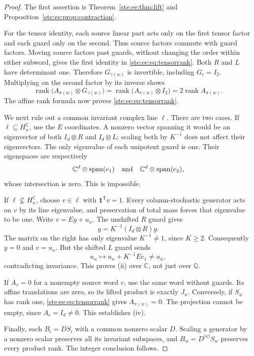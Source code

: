 \documentclass[11pt,letterpaper]{article}
\theoremstyle{definition}
\theoremstyle{remark}
\newcommand{\Q}{\mathbb Q}
\newcommand{\C}{\mathbb C}
\newcommand{\one}{\mathbf 1}
\newcommand{\rk}{\operatorname{rank}}
\newcommand{\transpose}{^{\mathsf T}}
\begin{document}
\begin{proof}
The first assertion is Theorem~\ref{ste:ee:thm:lift} and
Proposition~\ref{ste:ee:prop:contraction}.

For the tensor identity, each source linear part acts only on the first tensor
factor and each guard only on the second. Thus source factors commute with guard
factors. Moving source factors past guards, without changing the order within
either subword, gives the first identity in \eqref{ste:ee:eq:tensorrank}. Both $R$ and
$L$ have determinant one. Therefore $G_{\gamma(w)}$ is invertible, including
$G_\epsilon=I_2$. Multiplying on the second factor by its inverse shows
\[
 \rk\bigl(A_{\pi(w)}\otimes G_{\gamma(w)}\bigr)
 =\rk\bigl(A_{\pi(w)}\otimes I_2\bigr)=2\rk A_{\pi(w)}.
\]
The affine rank formula now proves \eqref{ste:ee:eq:tensorrank}.

We next rule out a common invariant complex line $\ell$. There are two cases.
If $\ell\subseteq H_n^{\C}$, use the $E$ coordinates. A nonzero vector spanning
it would be an eigenvector of both $I_d\otimes R$ and $I_d\otimes L$; scaling
both by $K^{-1}$ does not affect their eigenvectors. The only eigenvalue of each
unipotent guard is one. Their eigenspaces are respectively
\[
 \C^d\otimes\operatorname{span}(e_1)
 \quad\hbox{and}\quad
 \C^d\otimes\operatorname{span}(e_2),
\]
whose intersection is zero. This is impossible.

If $\ell\not\subseteq H_n^{\C}$, choose $v\in\ell$ with
$\one\transpose v=1$. Every column-stochastic generator acts on $v$ by its
line eigenvalue, and preservation of total mass forces that eigenvalue to be
one. Write $v=Ey+u_n$. The unshifted $R$ guard gives
\[
 y=K^{-1}(I_d\otimes R)y.
\]
The matrix on the right has only eigenvalue $K^{-1}\ne1$, since $K\geq2$.
Consequently $y=0$ and $v=u_n$. But the shifted $L$ guard sends
\[
 u_n\longmapsto u_n+K^{-1}Ee_1\ne u_n,
\]
contradicting invariance. This proves (ii) over $\C$, not just over $\Q$.

If $A_v=0$ for a nonempty source word $v$, use the same word without guards.
Its affine translations are zero, so its lifted product is exactly $J_n$.
Conversely, if $S_w$ has rank one, \eqref{ste:ee:eq:tensorrank} gives
$A_{\pi(w)}=0$. The projection cannot be empty, since $A_\epsilon=I_d\ne0$.
This establishes (iv).

Finally, each $B_i=DS_i$ with a common nonzero scalar $D$. Scaling a generator
by a nonzero scalar preserves all its invariant subspaces, and
$B_w=D^{|w|}S_w$ preserves every product rank. The integer conclusion follows.
\end{proof}
\end{document}
